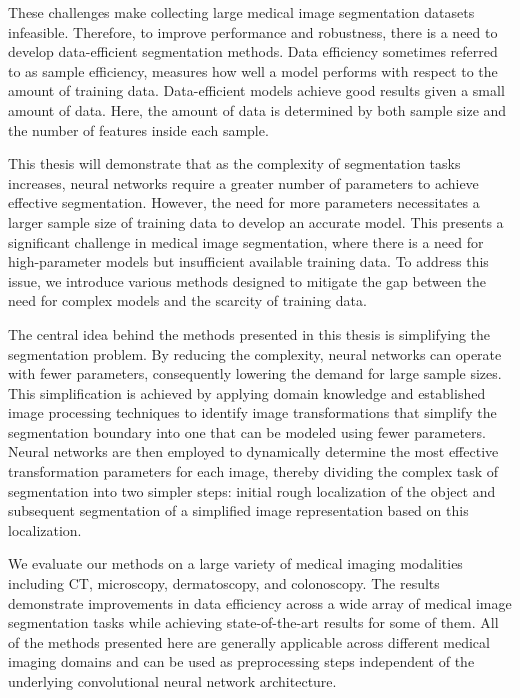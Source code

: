 These challenges make collecting large medical image segmentation datasets infeasible. Therefore, to improve performance and robustness, there is a need to develop data-efficient segmentation methods. Data efficiency sometimes referred to as sample efficiency, measures how well a model performs with respect to the amount of training data. Data-efficient models achieve good results given a small amount of data. Here, the amount of data is determined by both sample size and the number of features inside each sample.

This thesis will demonstrate that as the complexity of segmentation tasks increases, neural networks require a greater number of parameters to achieve effective segmentation. However, the need for more parameters necessitates a larger sample size of training data to develop an accurate model. This presents a significant challenge in medical image segmentation, where there is a need for high-parameter models but insufficient available training data. To address this issue, we introduce various methods designed to mitigate the gap between the need for complex models and the scarcity of training data.

The central idea behind the methods presented in this thesis is simplifying the segmentation problem. By reducing the complexity, neural networks can operate with fewer parameters, consequently lowering the demand for large sample sizes. This simplification is achieved by applying domain knowledge and established image processing techniques to identify image transformations that simplify the segmentation boundary into one that can be modeled using fewer parameters. Neural networks are then employed to dynamically determine the most effective transformation parameters for each image, thereby dividing the complex task of segmentation into two simpler steps: initial rough localization of the object and subsequent segmentation of a simplified image representation based on this localization.

We evaluate our methods on a large variety of medical imaging modalities including CT, microscopy, dermatoscopy, and colonoscopy. The results demonstrate improvements in data efficiency across a wide array of medical image segmentation tasks while achieving state-of-the-art results for some of them. All of the methods presented here are generally applicable across different medical imaging domains and can be used as preprocessing steps independent of the underlying convolutional neural network architecture.

